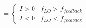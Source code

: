 \documentclass[preview]{standalone}
\begin{document}
\begin{align*}
= \begin{cases}I > 0 & f_{LO} > f_{feedback} \\I < 0 & f_{LO} < f_{feedback}\end{cases}
\end{align*}
\end{document}
